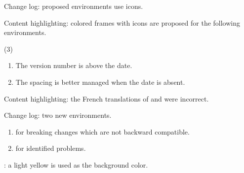 \begin{tdocnew}
    \item Change log: proposed environments use icons.


    \item Content highlighting: colored frames with icons are proposed for the following environments.
    \begin{tasks}[label=\arabic*.](3)
        \task {}
        \task {}
        \task {}
        \task {}
        \task {}
    \end{tasks}
\end{tdocnew}

\tdocsep




\begin{tdocupdate}[version = 1.2.0-a, date = 2024-08-23]
    \item {}
    \begin{enumerate}
        \item The version number is above the date.

        \item The spacing is better managed when the date is absent.
    \end{enumerate}
\end{tdocupdate}


\begin{tdocfix}
    \item Content highlighting: the French translations of  and  were incorrect.
\end{tdocfix}

\tdocsep




\begin{tdocnew}[version = 1.1.0, date = 2024-01-06]
    \item Change log: two new environments.
    \begin{enumerate}
        \item {} for breaking changes which are not backward compatible.

        \item {} for identified problems.
    \end{enumerate}

    \item {}: a light yellow is used as the background color.
\end{tdocnew}

